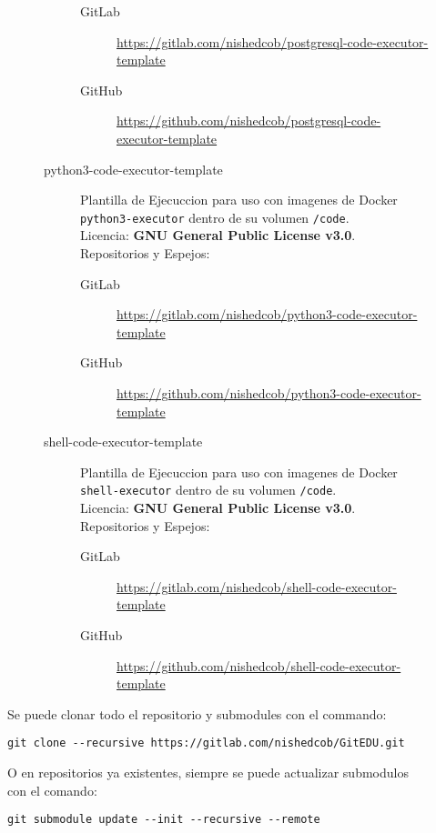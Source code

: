 \begin{description}
\begin{description}
\begin{description}
\begin{description}
            	\item[GitLab] \sloppy \url{https://gitlab.com/nishedcob/postgresql-code-executor-template}
                \item[GitHub] \sloppy \url{https://github.com/nishedcob/postgresql-code-executor-template}
            \end{description}
        	\item[python3-code-executor-template] Plantilla de Ejecuccion para uso con imagenes de Docker \texttt{python3-executor} dentro de su volumen \texttt{/code}.\\
            Licencia: \textbf{GNU General Public License v3.0}. \\
            Repositorios y Espejos:
            \begin{description}
            	\item[GitLab] \sloppy \url{https://gitlab.com/nishedcob/python3-code-executor-template}
                \item[GitHub] \sloppy \url{https://github.com/nishedcob/python3-code-executor-template}
            \end{description}
        	\item[shell-code-executor-template] Plantilla de Ejecuccion para uso con imagenes de Docker \texttt{shell-executor} dentro de su volumen \texttt{/code}.\\
            Licencia: \textbf{GNU General Public License v3.0}. \\
            Repositorios y Espejos:
            \begin{description}
            	\item[GitLab] \sloppy \url{https://gitlab.com/nishedcob/shell-code-executor-template}
                \item[GitHub] \sloppy \url{https://github.com/nishedcob/shell-code-executor-template}
            \end{description}
        \end{description}
    \end{description}
    Se puede clonar todo el repositorio y submodules con el commando:
    \begin{lstlisting}[breaklines]
git clone --recursive https://gitlab.com/nishedcob/GitEDU.git
    \end{lstlisting}
    O en repositorios ya existentes, siempre se puede actualizar submodulos con el comando:
    \begin{lstlisting}
git submodule update --init --recursive --remote
    \end{lstlisting}
\end{description}
